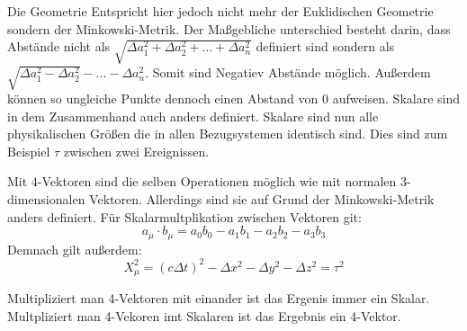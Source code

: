 \documentclass[12pt]{article}
\begin{document}
Die Geometrie Entspricht hier jedoch nicht mehr der Euklidischen Geometrie sondern der Minkowski-Metrik.
Der Maßgebliche unterschied besteht darin, dass Abstände nicht als $\sqrt{\Delta a_1^2 + \Delta a_2^2 + ... + \Delta a_n^2}$ definiert sind sondern als $\sqrt{\Delta a_1^2 - \Delta a_2^2} - ... - \Delta a_n^2$.%
Somit sind Negatiev Abstände möglich.
Außerdem können so ungleiche Punkte dennoch einen Abstand von 0 aufweisen.
Skalare sind in dem Zusammenhand auch anders definiert.
Skalare sind nun alle physikalischen Größen die in allen Bezugsystemen identisch sind.
Dies sind zum Beispiel $\tau$ zwischen zwei Ereignissen.%

Mit 4-Vektoren sind die selben Operationen möglich wie mit normalen 3-dimensionalen Vektoren.
Allerdings sind sie auf Grund der Minkowski-Metrik anders definiert.
Für Skalarmultplikation zwischen Vektoren git:
\begin{equation}
	a_\mu \cdot b_\mu = a_0 b_0 - a_1 b_1 - a_2 b_2 - a_3 b_3
\end{equation}
Demnach gilt außerdem:
\begin{equation}
X_\mu ^2 = (c\Delta t)^2 - \Delta x^2 - \Delta y^2 - \Delta z^2 = \tau^2
\end{equation}

Multipliziert man 4-Vektoren mit einander ist das Ergenis immer ein Skalar.
Multpliziert man 4-Vekoren imt Skalaren ist das Ergebnis ein 4-Vektor.
\end{document}
